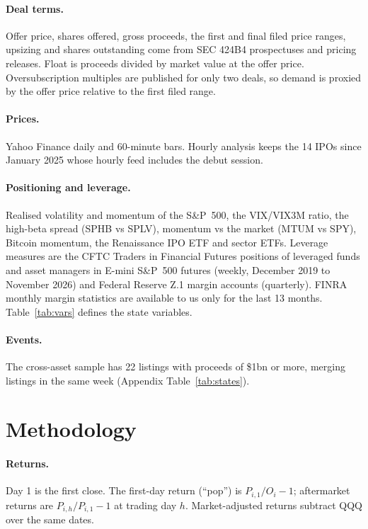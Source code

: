 \documentclass[11pt]{article}
\begin{document}
\paragraph{Deal terms.} Offer price, shares offered, gross proceeds, the first and final filed price ranges, upsizing and shares outstanding come from SEC 424B4 prospectuses and pricing releases. Float is proceeds divided by market value at the offer price. Oversubscription multiples are published for only two deals, so demand is proxied by the offer price relative to the first filed range.

\paragraph{Prices.} Yahoo Finance daily and 60-minute bars. Hourly analysis keeps the 14 IPOs since January 2025 whose hourly feed includes the debut session.

\paragraph{Positioning and leverage.} Realised volatility and momentum of the S\&P~500, the VIX/VIX3M ratio, the high-beta spread (SPHB vs SPLV), momentum vs the market (MTUM vs SPY), Bitcoin momentum, the Renaissance IPO ETF and sector ETFs. Leverage measures are the CFTC Traders in Financial Futures positions of leveraged funds and asset managers in E-mini S\&P~500 futures (weekly, December 2019 to November 2026) and Federal Reserve Z.1 margin accounts (quarterly). FINRA monthly margin statistics are available to us only for the last 13 months. Table~\ref{tab:vars} defines the state variables.

\paragraph{Events.} The cross-asset sample has 22 listings with proceeds of \$1bn or more, merging listings in the same week (Appendix Table~\ref{tab:states}).




\section{Methodology}

\paragraph{Returns.} Day 1 is the first close. The first-day return (``pop'') is $P_{i,1}/O_i-1$; aftermarket returns are $P_{i,h}/P_{i,1}-1$ at trading day $h$. Market-adjusted returns subtract QQQ over the same dates.
\end{document}
